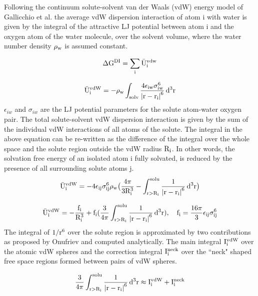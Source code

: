 \documentclass[12pt]{report}
\begin{document}
Following the continuum solute-solvent van der Waals (vdW) energy model of Gallicchio et al. \cite{Levy03} the average vdW
dispersion interaction of atom i with water is given by the integral of the attractive LJ potential between atom i and the
oxygen atom of the water molecule, over the solvent volume, where the water number density  $\rm \rho_w$  is assumed constant.

\begin{equation}
\rm \Delta G^{DI} = \sum_i \bar{U}_i^{vdw} 
\end{equation}

\begin{equation}\label{eq:disp}
\rm \bar{U}^{vdW}_i = -\rho_w \int_{solv} \frac{4\epsilon_{iw}\sigma_{iw}^6}{\left |r-r_i\right |^6} \,d^3r 
\end{equation}
$\epsilon_{iw} $ and $\sigma_{iw}$ are the LJ potential parameters for the solute atom-water oxygen pair.  The total solute-solvent
vdW dispersion interaction is given by the sum of the individual vdW interactions of all atoms of the solute. The integral in the
above equation can be re-written as the difference of the integral over the whole space and the solute region outside the vdW
radius $\rm R_i$. In other words, the solvation free energy of an isolated atom i fully solvated, is reduced by the presence of
all surrounding solute atoms j.    
\begin{equation}\label{eq:disp2}
\rm \bar{U}^{vdW}_i = - 4\epsilon_{ij}\sigma_{ij}^6 \rho_w \big(\frac{4\pi}{3R_i^3} 
    - \int_{r>R_i}^{solu} \frac{1}{\left|r-r_i\right|^6} \,d^3r\big) 
\end{equation}

\begin{equation}\label{eq:uvdw}
\rm \bar{U}^{vdW}_i =  -\frac{f_i}{R_i^3} + f_i (\frac{3}{4\pi}\int_{r>R_i}^{solu} \frac{1}{\left|r-r_i\right|^6} \,d^3r), \quad f_i  
     =  \frac{16\pi}{3}\epsilon_{ij}\sigma_{ij}^6 
\end{equation}
The integral of $\rm1/r^6$ over the solute region is approximated by two contributions as proposed by Onufriev \cite{Aguilar10}
and computed analytically. The main integral  $\rm I_i^{vdW}$ over the atomic vdW spheres and the correction integral
$\rm I_i^{neck}$ over the ``neck" shaped free space regions formed between pairs of vdW spheres.    

\begin{equation}\label{eq:integrals}
\rm  \frac{3}{4\pi}\int_{r>R_i}^{solu} \frac{1}{\left|r-r_i\right|^6} \,d^3r  \approx  I_i^{vdW} + I_i^{neck} 
\end{equation}
\end{document}
